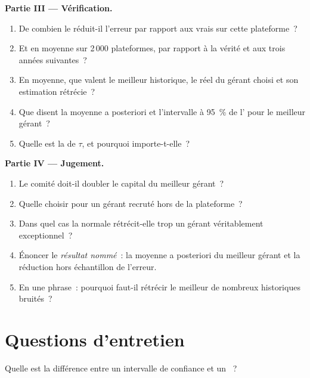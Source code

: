 \begin{problem}
\medskip\noindent\textbf{Partie III --- Vérification.}
\begin{enumerate}[resume]
\item De combien le  réduit-il l'erreur par rapport aux vrais  sur cette plateforme~?
\item Et en moyenne sur 2\,000 plateformes, par rapport à la vérité et aux trois années suivantes~?
\item En moyenne, que valent le meilleur historique, le  réel du gérant choisi et son estimation rétrécie~?
\item Que disent la moyenne a posteriori et l'intervalle à 95~\% de l' pour le meilleur gérant~?
\item Quelle est la  de $\tau$, et pourquoi importe-t-elle~?
\end{enumerate}

\medskip\noindent\textbf{Partie IV --- Jugement.}
\begin{enumerate}[resume]
\item Le comité doit-il doubler le capital du meilleur gérant~?
\item Quelle  choisir pour un gérant recruté hors de la plateforme~?
\item Dans quel cas la  normale rétrécit-elle trop un gérant véritablement exceptionnel~?
\item Énoncer le \emph{résultat nommé}~: la moyenne a posteriori du meilleur gérant et la réduction hors échantillon de l'erreur.
\item En une phrase~: pourquoi faut-il rétrécir le meilleur de nombreux historiques bruités~?
\end{enumerate}
\end{problem}

\section{Questions d'entretien}

\begin{interviewq}\label{iq:qm:bayesian-methods:1}
Quelle est la différence entre un intervalle de confiance et un ~?
\end{interviewq}

